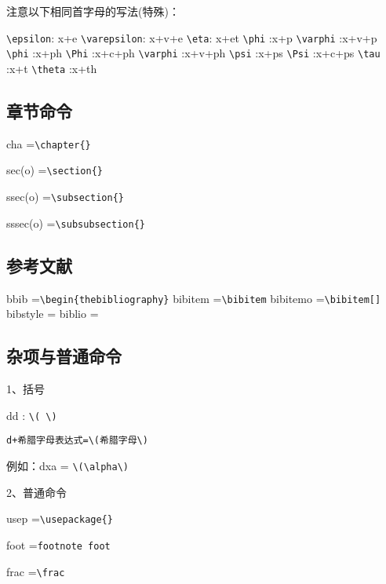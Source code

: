 注意以下相同首字母的写法(特殊)：

\verb|\epsilon|: x+e
\verb|\varepsilon|: x+v+e
\verb|\eta|: x+et
\verb|\phi| :x+p
\verb|\varphi| :x+v+p
\verb|\phi| :x+ph
\verb|\Phi| :x+c+ph
\verb|\varphi| :x+v+ph
\verb|\psi| :x+ps
\verb|\Psi| :x+c+ps
\verb|\tau| :x+t
\verb|\theta| :x+th
 
 
 
 \subsection{章节命令}
cha     =\verb|\chapter{}|

sec(o)   =\verb|\section{}|

ssec(o)  =\verb|\subsection{}|

sssec(o) =\verb|\subsubsection{}|

 
\subsection{参考文献}
bbib      =\verb|\begin{thebibliography}|
bibitem   =\verb|\bibitem|
bibitemo  =\verb|\bibitem[]|
bibstyle   =\verb||
biblio     =\verb||
 
  
 \subsection{杂项与普通命令}
1、括号

dd : \verb|\( \)|

\verb|d+希腊字母表达式=\(希腊字母\)|

例如：dxa = \verb|\(\alpha\)|
 
2、普通命令

usep   =\verb|\usepackage{}|

foot    =\verb|footnote foot|

frac    =\verb|\frac|

